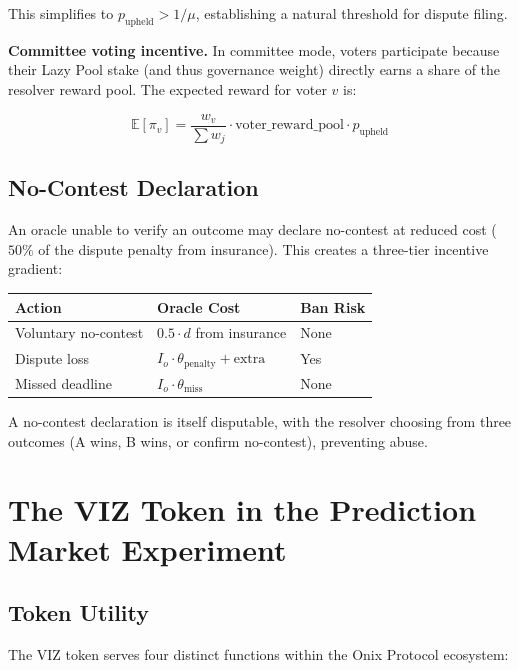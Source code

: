 \documentclass{ledger}
\theoremstyle{plain}
\theoremstyle{remark}
\begin{document}
This simplifies to $p_{\text{upheld}} > 1/\mu$, establishing a natural threshold
for dispute filing.

\textbf{Committee voting incentive.} In committee mode, voters participate
because their Lazy Pool stake (and thus governance weight) directly earns a share
of the resolver reward pool. The expected reward for voter $v$ is:

\[
\mathbb{E}[\pi_v] = \frac{w_v}{\sum w_j} \cdot \text{voter\_reward\_pool} \cdot
p_{\text{upheld}}
\]

\subsection{No-Contest Declaration}

An oracle unable to verify an outcome may declare no-contest at reduced cost
($50\%$ of the dispute penalty from insurance). This creates a three-tier
incentive gradient:

\begin{center}
\begin{tabular}{lll}
\hline
\textbf{Action} & \textbf{Oracle Cost} & \textbf{Ban Risk} \\
\hline
Voluntary no-contest & $0.5 \cdot d$ from insurance & None \\
Dispute loss & $I_o \cdot \theta_{\text{penalty}} + \text{extra}$ & Yes \\
Missed deadline & $I_o \cdot \theta_{\text{miss}}$ & None \\
\hline
\end{tabular}
\end{center}

A no-contest declaration is itself disputable, with the resolver choosing from
three outcomes (A wins, B wins, or confirm no-contest), preventing abuse.

\section{The VIZ Token in the Prediction Market Experiment}\label{sec:token}

\subsection{Token Utility}

The VIZ token serves four distinct functions within the Onix Protocol ecosystem:
\end{document}
